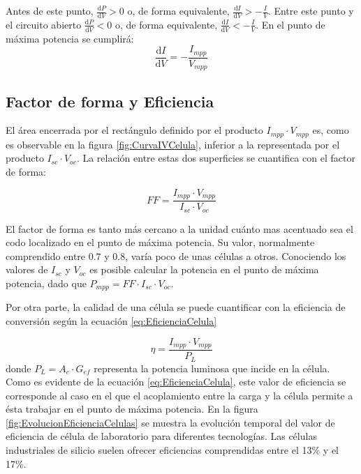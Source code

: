 Antes de este punto, $\frac{\mathrm{d}P}{\mathrm{d}V}>0$ o, de
forma equivalente, $\frac{\mathrm{d}I}{\mathrm{d}V}>-\frac{I}{V}$.
Entre este punto y el circuito abierto $\frac{\mathrm{d}P}{\mathrm{d}V}<0$
o, de forma equivalente, $\frac{\mathrm{d}I}{\mathrm{d}V}<-\frac{I}{V}$.
En el punto de máxima potencia se cumplirá:\begin{equation}
\frac{\mathrm{d}I}{\mathrm{d}V}=-\frac{I_{mpp}}{V_{mpp}}\label{eq:MPP_derivada}\end{equation}



\subsection{Factor de forma y Eficiencia}

El área encerrada por el rectángulo definido por el producto $I_{mpp}\cdot V_{mpp}$
es, como es observable en la figura \ref{fig:CurvaIVCelula}, inferior
a la representada por el producto $I_{sc}\cdot V_{oc}$. La relación
entre estas dos superficies se cuantifica con el factor de forma:

\begin{equation}
FF=\frac{I_{mpp}\cdot V_{mpp}}{I_{sc}\cdot V_{oc}}\label{eq:FactorForma}\end{equation}

El factor de forma es tanto más cercano a la unidad cuánto mas acentuado
sea el codo localizado en el punto de máxima potencia. Su valor, normalmente
comprendido entre $0.7$ y $0.8$, varía poco de unas células a otros.
Conociendo los valores de $I_{sc}$ y $V_{oc}$ es posible calcular
la potencia en el punto de máxima potencia, dado que $P_{mpp}=FF\cdot I_{sc}\cdot V_{oc}$.

Por otra parte, la calidad de una célula se puede cuantificar con
la eficiencia de conversión según la ecuación \ref{eq:EficienciaCelula}

\begin{equation}
\eta=\frac{I_{mpp}\cdot V_{mpp}}{P_{L}}\label{eq:EficienciaCelula}\end{equation}
donde $P_{L} = A_c \cdot G_{ef}$ representa la potencia luminosa que incide en la célula.
Como es evidente de la ecuación \ref{eq:EficienciaCelula}, este valor
de eficiencia se corresponde al caso en el que el acoplamiento entre
la carga y la célula permite a ésta trabajar en el punto de máxima
potencia. En la figura \ref{fig:EvolucionEficienciaCelulas}
se muestra la evolución temporal del valor de eficiencia de célula
de laboratorio para diferentes tecnologías. Las células industriales
de silicio suelen ofrecer eficiencias comprendidas entre el 13\% y
el 17\%.

